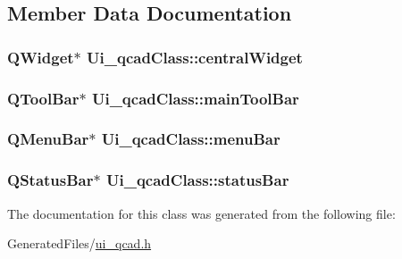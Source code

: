 \subsection{Member Data Documentation}
\hypertarget{class_ui__qcad_class_a6a62e5987d2a5f0886442c66b7692490}{
\subsubsection[{central\-Widget}]{\setlength{\rightskip}{0pt plus 5cm}Q\-Widget$\ast$ Ui\-\_\-qcad\-Class\-::central\-Widget}}\label{class_ui__qcad_class_a6a62e5987d2a5f0886442c66b7692490}
\hypertarget{class_ui__qcad_class_abf54d7057f9aeae67ba888383f43d09f}{
\subsubsection[{main\-Tool\-Bar}]{\setlength{\rightskip}{0pt plus 5cm}Q\-Tool\-Bar$\ast$ Ui\-\_\-qcad\-Class\-::main\-Tool\-Bar}}\label{class_ui__qcad_class_abf54d7057f9aeae67ba888383f43d09f}
\hypertarget{class_ui__qcad_class_a2e3dbba7861a6c972639e10fe3c0cb57}{
\subsubsection[{menu\-Bar}]{\setlength{\rightskip}{0pt plus 5cm}Q\-Menu\-Bar$\ast$ Ui\-\_\-qcad\-Class\-::menu\-Bar}}\label{class_ui__qcad_class_a2e3dbba7861a6c972639e10fe3c0cb57}
\hypertarget{class_ui__qcad_class_a68bc3eaf99074a517c853449518a3f84}{
\subsubsection[{status\-Bar}]{\setlength{\rightskip}{0pt plus 5cm}Q\-Status\-Bar$\ast$ Ui\-\_\-qcad\-Class\-::status\-Bar}}\label{class_ui__qcad_class_a68bc3eaf99074a517c853449518a3f84}


The documentation for this class was generated from the following file\-:\begin{DoxyCompactItemize}
\item 
Generated\-Files/\hyperlink{ui__qcad_8h}{ui\-\_\-qcad.\-h}\end{DoxyCompactItemize}
